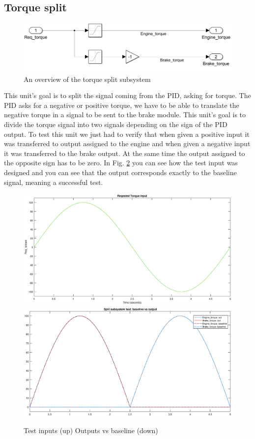 \documentclass[12pt,a4paper]{report}
\begin{document}
\subsection{Torque split}
\begin{figure}[!h]
	\centering
	\includegraphics[scale=0.34]{split_subs.jpg}
	\caption{An overview of the torque split subsystem}
	\label{split_subs}
\end{figure}
This unit’s goal is to split the signal coming from the PID, asking for torque. The PID asks for a negative or positive torque, we have to be able to translate the negative torque in a signal to be sent to the brake module. This unit’s goal is to divide the torque signal into two signals depending on the sign of the PID output. To test this unit we just had to verify that when given a positive input it was transferred to output assigned to the engine and when given a negative input it was transferred to the brake output. At the same time the output assigned to the opposite sign has to be zero.
In Fig. \ref{input_split_test} you can see how the test input was designed and you can see that the output corresponds exactly to the baseline signal, meaning a successful test.
\begin{figure}[!hbt]
	\centering
	\includegraphics[scale=0.4]{input_split_test}\hfill
	\includegraphics[scale=0.4]{out_split_test}
	\caption{Test inputs (up) Outputs vs baseline (down)}
	\label{input_split_test}
\end{figure}
\FloatBarrier
\end{document}

